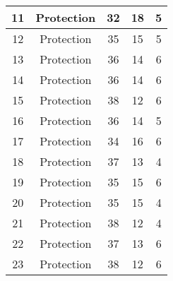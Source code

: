 \documentclass[results.tex]{subfiles}
\begin{document}
\begin{center}
\begin{tabular}{| c || c | c | c | c |}
            \hline
            11                      & Protection                   & 32                     & 18                      & 5                    \\
            \hline
            12                      & Protection                   & 35                     & 15                      & 5                    \\
            \hline
            13                      & Protection                   & 36                     & 14                      & 6                    \\
            \hline
            14                      & Protection                   & 36                     & 14                      & 6                    \\
            \hline
            15                      & Protection                   & 38                     & 12                      & 6                    \\
            \hline
            16                      & Protection                   & 36                     & 14                      & 5                    \\
            \hline
            17                      & Protection                   & 34                     & 16                      & 6                    \\
            \hline
            18                      & Protection                   & 37                     & 13                      & 4                    \\
            \hline
            19                      & Protection                   & 35                     & 15                      & 6                    \\
            \hline
            20                      & Protection                   & 35                     & 15                      & 4                    \\
            \hline
            21                      & Protection                   & 38                     & 12                      & 4                    \\
            \hline
            22                      & Protection                   & 37                     & 13                      & 6                    \\
            \hline
            23                      & Protection                   & 38                     & 12                      & 6                    \\

\end{tabular}
\end{center}
\end{document}
